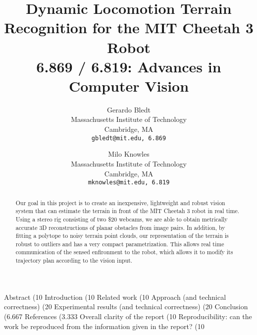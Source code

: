 \documentclass[10pt,twocolumn,letterpaper]{article}
\begin{document}
\title{Dynamic Locomotion Terrain Recognition for the MIT Cheetah 3 Robot \\ 6.869 / 6.819: Advances in Computer Vision}

\author{Gerardo Bledt\\
Massachusetts Institute of Technology\\
Cambridge, MA\\
{\tt\small gbledt@mit.edu, 6.869}
\and
Milo Knowles\\
Massachusetts Institute of Technology\\
Cambridge, MA\\
{\tt\small mknowles@mit.edu, 6.819}
}

\maketitle

\begin{abstract}
   Our goal in this project is to create an inexpensive, lightweight and robust vision system that can estimate the terrain in front of the MIT Cheetah 3 robot in real time. Using a stereo rig consisting of two \$20 webcams, we are able to obtain metrically accurate 3D reconstructions of planar obstacles from image pairs. In addition, by fitting a polytope to noisy terrain point clouds, our representation of the terrain is robust to outliers and has a very compact parametrization. This allows real time communication of the sensed enfironment to the robot, which allows it to modify its trajectory plan according to the vision input.
\end{abstract}












Abstract (10%
Introduction (10%
Related work (10%
Approach (and technical correctness) (20%
Experimental results (and technical correctness) (20%
Conclusion (6.667%
References (3.333%
Overall clarity of the report (10%
Reproducibility: can the work be reproduced from the information given in the report? (10%

{\small


}
\end{document}
